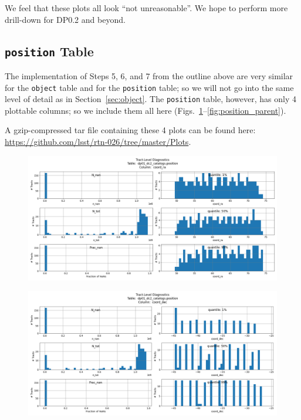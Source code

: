 \documentclass[DM,authoryear,toc]{lsstdoc}
\begin{document}
We feel that these plots all look ``not unreasonable''.  We hope to
perform more drill-down for DP0.2 and beyond.




\subsection{\texttt{position} Table} \label{sec:position}

The implementation of Steps 5, 6, and 7 from the outline above are
very similar for the \texttt{object} table and for the
\texttt{position} table; so we will not go into the same
level of detail as in Section~\ref{sec:object}.  The \texttt{position}
table, however, has only 4 plottable columns; so we include them all here
(Figs.~\ref{fig:position_coord_ra}--\ref{fig:position_parent}).

A gzip-compressed tar file containing these 4 plots can be found here:
\url{https://github.com/lsst/rtn-026/tree/master/Plots}.

\begin{figure}[h]
\centering
\includegraphics[width=1.0\linewidth]{Plots/TAP_verify_DP01.dp01_dc2_catalogs.position.coord_ra.png}
\caption{}
\label{fig:position_coord_ra}
\end{figure}

\begin{figure}[h]
\centering
\includegraphics[width=1.0\linewidth]{Plots/TAP_verify_DP01.dp01_dc2_catalogs.position.coord_dec.png}
\caption{}
\label{fig:position_coord_dec}
\end{figure}
\end{document}
